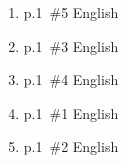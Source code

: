 \documentclass[a4paper,11pt]{jsarticle}
\begin{document}
\begin{enumerate}
  \setlength{\itemsep}{2truecm}
  \item
    p.1~\#5 English
  \item
    p.1~\#3 English
  \item
    p.1~\#4 English
  \item
    p.1~\#1 English
  \item
    p.1~\#2 English
\end{enumerate}
\end{document}
